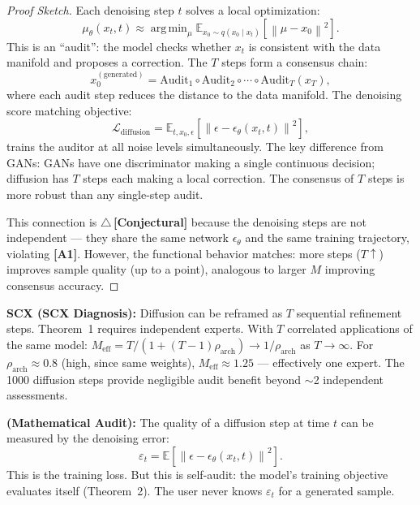 \documentclass[12pt,a4paper]{article}
\theoremstyle{definition}
\newcommand{\rigorConjectural}{{\color{red!70!black}$\triangle$\,\textbf{[Conjectural]}}}
\DeclareMathOperator*{\argmin}{arg\,min}
\newcommand{\E}{\mathbb{E}}
\newcommand{\norm}[1]{\left\lVert#1\right\rVert}
\newcommand{\asmTag}[1]{\textsf{\textbf{[A#1]}}}
\newcommand{\diagnosis}{\noindent\textbf{SCX (SCX Diagnosis):} }
\newcommand{\mathAudit}{\noindent\textbf{ (Mathematical Audit):} }
\begin{document}
\begin{proof}[Proof Sketch]
Each denoising step $t$ solves a local optimization:
\begin{equation}
    \mu_\theta(x_t, t) \approx \argmin_{\mu} \E_{x_0 \sim q(x_0 \mid x_t)}\left[\norm{\mu - x_0}^2\right].
\end{equation}
This is an ``audit'': the model checks whether $x_t$ is consistent with the data manifold and proposes a correction. The $T$ steps form a consensus chain:
\begin{equation}
    x_0^{(\text{generated})} = \text{Audit}_1 \circ \text{Audit}_2 \circ \cdots \circ \text{Audit}_T (x_T),
\end{equation}
where each audit step reduces the distance to the data manifold. The denoising score matching objective:
\begin{equation}
    \mathcal{L}_{\text{diffusion}} = \E_{t, x_0, \epsilon}\left[\norm{\epsilon - \epsilon_\theta(x_t, t)}^2\right],
\end{equation}
trains the auditor at all noise levels simultaneously. The key difference from GANs: GANs have one discriminator making a single continuous decision; diffusion has $T$ steps each making a local correction. The consensus of $T$ steps is more robust than any single-step audit.

This connection is \rigorConjectural{} because the denoising steps are not independent — they share the same network $\epsilon_\theta$ and the same training trajectory, violating \asmTag{1}. However, the functional behavior matches: more steps ($T \uparrow$) improves sample quality (up to a point), analogous to larger $M$ improving consensus accuracy.
\end{proof}

\diagnosis{} Diffusion can be reframed as $T$ sequential refinement steps. Theorem~1 requires independent experts. With $T$ correlated applications of the same model: $M_{\text{eff}} = T / (1 + (T-1)\rho_{\text{arch}}) \to 1/\rho_{\text{arch}}$ as $T \to \infty$. For $\rho_{\text{arch}} \approx 0.8$ (high, since same weights), $M_{\text{eff}} \approx 1.25$ — effectively one expert. The 1000 diffusion steps provide negligible audit benefit beyond $\sim$2 independent assessments.

\mathAudit{} The quality of a diffusion step at time $t$ can be measured by the denoising error:
\[
\varepsilon_t = \E[\norm{\epsilon - \epsilon_\theta(x_t, t)}^2].
\]
This is the training loss. But this is self-audit: the model's training objective evaluates itself (Theorem~2). The user never knows $\varepsilon_t$ for a generated sample.
\end{document}

